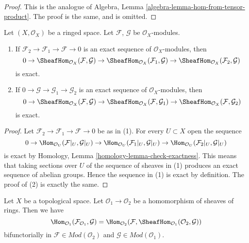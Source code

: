 \begin{proof}
This is the analogue of
Algebra, Lemma \ref{algebra-lemma-hom-from-tensor-product}.
The proof is the same, and is omitted.
\end{proof}

\begin{lemma}
\label{lemma-internal-hom-exact}
Let $(X, \mathcal{O}_X)$ be a ringed space.
Let $\mathcal{F}$, $\mathcal{G}$ be $\mathcal{O}_X$-modules.
\begin{enumerate}
\item If $\mathcal{F}_2 \to \mathcal{F}_1 \to \mathcal{F} \to 0$
is an exact sequence of $\mathcal{O}_X$-modules, then
$$
0 \to
\SheafHom_{\mathcal{O}_X}(\mathcal{F}, \mathcal{G}) \to
\SheafHom_{\mathcal{O}_X}(\mathcal{F}_1, \mathcal{G}) \to
\SheafHom_{\mathcal{O}_X}(\mathcal{F}_2, \mathcal{G})
$$
is exact.
\item If $0 \to \mathcal{G} \to \mathcal{G}_1 \to \mathcal{G}_2$
is an exact sequence of $\mathcal{O}_X$-modules, then
$$
0 \to
\SheafHom_{\mathcal{O}_X}(\mathcal{F}, \mathcal{G}) \to
\SheafHom_{\mathcal{O}_X}(\mathcal{F}, \mathcal{G}_1) \to
\SheafHom_{\mathcal{O}_X}(\mathcal{F}, \mathcal{G}_2)
$$
is exact.
\end{enumerate}
\end{lemma}

\begin{proof}
Let $\mathcal{F}_2 \to \mathcal{F}_1 \to \mathcal{F} \to 0$
be as in (1). For every $U \subset X$ open the sequence
$$
0 \to \Hom_{\mathcal{O}_U}(\mathcal{F}|_U, \mathcal{G}|_U) \to
\Hom_{\mathcal{O}_U}(\mathcal{F}_1|_U, \mathcal{G}|_U) \to
\Hom_{\mathcal{O}_U}(\mathcal{F}_2|_U, \mathcal{G}|_U)
$$
is exact by Homology, Lemma \ref{homology-lemma-check-exactness}.
This means that
taking sections over $U$ of the sequence of sheaves in (1) produces
an exact sequence of abelian groups. Hence the sequence in (1) is exact
by definition. The proof of (2) is exactly the same.
\end{proof}

\begin{lemma}
\label{lemma-adjoint-tensor-restrict}
Let $X$ be a topological space. Let $\mathcal{O}_1 \to \mathcal{O}_2$
be a homomorphism of sheaves of rings. Then we have
$$
\Hom_{\mathcal{O}_1}(\mathcal{F}_{\mathcal{O}_1}, \mathcal{G}) =
\Hom_{\mathcal{O}_2}(\mathcal{F},
\SheafHom_{\mathcal{O}_1}(\mathcal{O}_2, \mathcal{G}))
$$
bifunctorially in $\mathcal{F} \in \textit{Mod}(\mathcal{O}_2)$
and $\mathcal{G} \in \textit{Mod}(\mathcal{O}_1)$.
\end{lemma}

